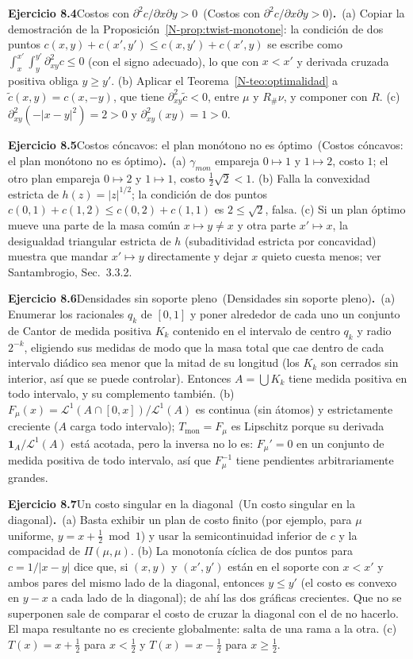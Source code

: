 \documentclass[11pt,a4paper]{amsart}
\newcommand{\LL}{{\mathcal L}}
\newcommand{\I}{{\mathbf 1}}
\theoremstyle{remark}
\theoremstyle{definition}
\numberwithin{subsection}{section}
\numberwithin{equation}{section}
\newcommand{\ejlabel}[2]{\par\medskip\noindent\textbf{Ejercicio #1}\ifx\relax#2\relax\else\ (#2)\fi\textbf{.}\ }
\begin{document}
\ejlabel{8.4}{Costos con $\partial^2c/\partial x\partial y>0$}(a) Copiar la demostración de la Proposición~\ref{N-prop:twist-monotone}: la condición de dos puntos $c(x,y)+c(x',y')\le c(x,y')+c(x',y)$ se escribe como $\int_x^{x'}\int_{y}^{y'}\partial^2_{xy}c\le0$ (con el signo adecuado), lo que con $x<x'$ y derivada cruzada positiva obliga $y\ge y'$. (b) Aplicar el Teorema~\ref{N-teo:optimalidad} a $\tilde c(x,y)=c(x,-y)$, que tiene $\partial^2_{xy}\tilde c<0$, entre $\mu$ y $R_\#\nu$, y componer con $R$. (c) $\partial^2_{xy}(-|x-y|^2)=2>0$ y $\partial^2_{xy}(xy)=1>0$.

\ejlabel{8.5}{Costos cóncavos: el plan monótono no es óptimo}(a) $\gamma_{mon}$ empareja $0\mapsto1$ y $1\mapsto2$, costo $1$; el otro plan empareja $0\mapsto2$ y $1\mapsto1$, costo $\frac12\sqrt2<1$. (b) Falla la convexidad estricta de $h(z)=|z|^{1/2}$; la condición de dos puntos $c(0,1)+c(1,2)\le c(0,2)+c(1,1)$ es $2\le\sqrt2$, falsa. (c) Si un plan óptimo mueve una parte de la masa común $x\mapsto y\ne x$ y otra parte $x'\mapsto x$, la desigualdad triangular estricta de $h$ (subaditividad estricta por concavidad) muestra que mandar $x'\mapsto y$ directamente y dejar $x$ quieto cuesta menos; ver Santambrogio, Sec.~3.3.2.

\ejlabel{8.6}{Densidades sin soporte pleno}(a) Enumerar los racionales $q_k$ de $[0,1]$ y poner alrededor de cada uno un conjunto de Cantor de medida positiva $K_k$ contenido en el intervalo de centro $q_k$ y radio $2^{-k}$, eligiendo sus medidas de modo que la masa total que cae dentro de cada intervalo diádico sea menor que la mitad de su longitud (los $K_k$ son cerrados sin interior, así que se puede controlar). Entonces $A=\bigcup K_k$ tiene medida positiva en todo intervalo, y su complemento también. (b) $F_\mu(x)=\LL^1(A\cap[0,x])/\LL^1(A)$ es continua (sin átomos) y estrictamente creciente ($A$ carga todo intervalo); $T_\text{mon}=F_\mu$ es Lipschitz porque su derivada $\I_A/\LL^1(A)$ está acotada, pero la inversa no lo es: $F_\mu'=0$ en un conjunto de medida positiva de todo intervalo, así que $F_\mu^{-1}$ tiene pendientes arbitrariamente grandes.

\ejlabel{8.7}{Un costo singular en la diagonal}(a) Basta exhibir un plan de costo finito (por ejemplo, para $\mu$ uniforme, $y=x+\frac12 \bmod 1$) y usar la semicontinuidad inferior de $c$ y la compacidad de $\Pi(\mu,\mu)$. (b) La monotonía cíclica de dos puntos para $c=1/|x-y|$ dice que, si $(x,y)$ y $(x',y')$ están en el soporte con $x<x'$ y ambos pares del mismo lado de la diagonal, entonces $y\le y'$ (el costo es convexo en $y-x$ a cada lado de la diagonal); de ahí las dos gráficas crecientes. Que no se superponen sale de comparar el costo de cruzar la diagonal con el de no hacerlo. El mapa resultante no es creciente globalmente: salta de una rama a la otra. (c) $T(x)=x+\frac12$ para $x<\frac12$ y $T(x)=x-\frac12$ para $x\ge\frac12$.
\end{document}
